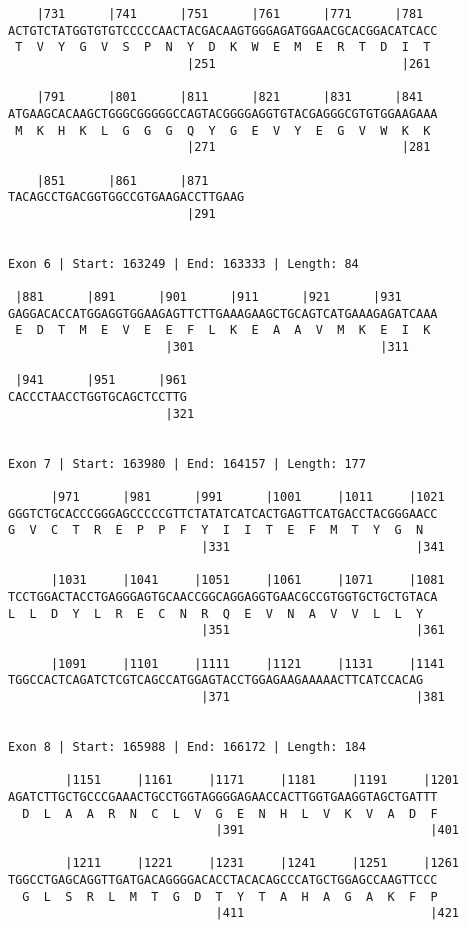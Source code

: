 \documentclass{article}
\begin{document}
\begin{Verbatim}
    |731      |741      |751      |761      |771      |781  
ACTGTCTATGGTGTGTCCCCCAACTACGACAAGTGGGAGATGGAACGCACGGACATCACC
 T  V  Y  G  V  S  P  N  Y  D  K  W  E  M  E  R  T  D  I  T 
                         |251                          |261 
  
    |791      |801      |811      |821      |831      |841  
ATGAAGCACAAGCTGGGCGGGGGCCAGTACGGGGAGGTGTACGAGGGCGTGTGGAAGAAA
 M  K  H  K  L  G  G  G  Q  Y  G  E  V  Y  E  G  V  W  K  K 
                         |271                          |281 
  
    |851      |861      |871     
TACAGCCTGACGGTGGCCGTGAAGACCTTGAAG
                         |291    
  
 
Exon 6 | Start: 163249 | End: 163333 | Length: 84
 
 |881      |891      |901      |911      |921      |931     
GAGGACACCATGGAGGTGGAAGAGTTCTTGAAAGAAGCTGCAGTCATGAAAGAGATCAAA
 E  D  T  M  E  V  E  E  F  L  K  E  A  A  V  M  K  E  I  K 
                      |301                          |311    
  
 |941      |951      |961
CACCCTAACCTGGTGCAGCTCCTTG
                      |321
  
 
Exon 7 | Start: 163980 | End: 164157 | Length: 177
 
      |971      |981      |991      |1001     |1011     |1021
GGGTCTGCACCCGGGAGCCCCCGTTCTATATCATCACTGAGTTCATGACCTACGGGAACC
G  V  C  T  R  E  P  P  F  Y  I  I  T  E  F  M  T  Y  G  N  
                           |331                          |341
  
      |1031     |1041     |1051     |1061     |1071     |1081
TCCTGGACTACCTGAGGGAGTGCAACCGGCAGGAGGTGAACGCCGTGGTGCTGCTGTACA
L  L  D  Y  L  R  E  C  N  R  Q  E  V  N  A  V  V  L  L  Y  
                           |351                          |361
  
      |1091     |1101     |1111     |1121     |1131     |1141
TGGCCACTCAGATCTCGTCAGCCATGGAGTACCTGGAGAAGAAAAACTTCATCCACAG
                           |371                          |381
  
 
Exon 8 | Start: 165988 | End: 166172 | Length: 184
 
        |1151     |1161     |1171     |1181     |1191     |1201
AGATCTTGCTGCCCGAAACTGCCTGGTAGGGGAGAACCACTTGGTGAAGGTAGCTGATTT
  D  L  A  A  R  N  C  L  V  G  E  N  H  L  V  K  V  A  D  F
                             |391                          |401
  
        |1211     |1221     |1231     |1241     |1251     |1261
TGGCCTGAGCAGGTTGATGACAGGGGACACCTACACAGCCCATGCTGGAGCCAAGTTCCC
  G  L  S  R  L  M  T  G  D  T  Y  T  A  H  A  G  A  K  F  P
                             |411                          |421
  

\end{Verbatim}
\end{document}
